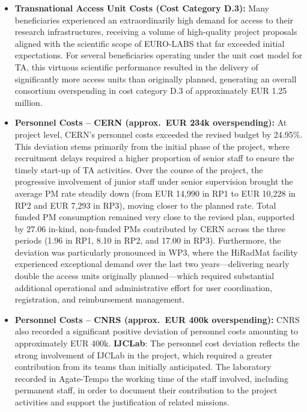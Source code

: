 \begin{itemize}
\item \textbf{Transnational Access Unit Costs (Cost Category D.3):}\newline
  Many beneficiaries experienced an extraordinarily high demand for access to their research infrastructures, receiving a volume of high-quality project proposals aligned with the scientific scope of EURO-LABS that far exceeded initial expectations. For several beneficiaries operating under the unit cost model for TA, this virtuous scientific performance resulted in the delivery of significantly more access units than originally planned, generating an overall consortium overspending in cost category D.3 of approximately EUR 1.25 million.
\item \textbf{Personnel Costs -- CERN (approx.\ EUR 234k overspending):}\newline
  At project level, CERN's personnel costs exceeded the revised budget by 24.95\%. This deviation stems primarily from the initial phase of the project, where recruitment delays required a higher proportion of senior staff to ensure the timely start-up of TA activities. Over the course of the project, the progressive involvement of junior staff under senior supervision brought the average PM rate steadily down (from EUR 14,990 in RP1 to EUR 10,228 in RP2 and EUR 7,293 in RP3), moving closer to the planned rate. Total funded PM consumption remained very close to the revised plan, supported by 27.06 in-kind, non-funded PMs contributed by CERN across the three periods (1.96 in RP1, 8.10 in RP2, and 17.00 in RP3). Furthermore, the deviation was particularly pronounced in WP3, where the HiRadMat facility experienced exceptional demand over the last two years---delivering nearly double the access units originally planned---which required substantial additional operational and administrative effort for user coordination, registration, and reimbursement management.
\item \textbf{Personnel Costs -- CNRS (approx.\ EUR 400k overspending):}\newline
  CNRS also recorded a significant positive deviation of personnel costs amounting to approximately EUR 400k. 
  \textbf{IJCLab}:
  The personnel cost deviation reflects the strong involvement of IJCLab in the project, which required a greater contribution from its teams than initially anticipated.
The laboratory recorded in Agate-Tempo the working time of the staff involved, including permanent staff, in order to document their contribution to the project activities and support the justification of related missions.

\end{itemize}

